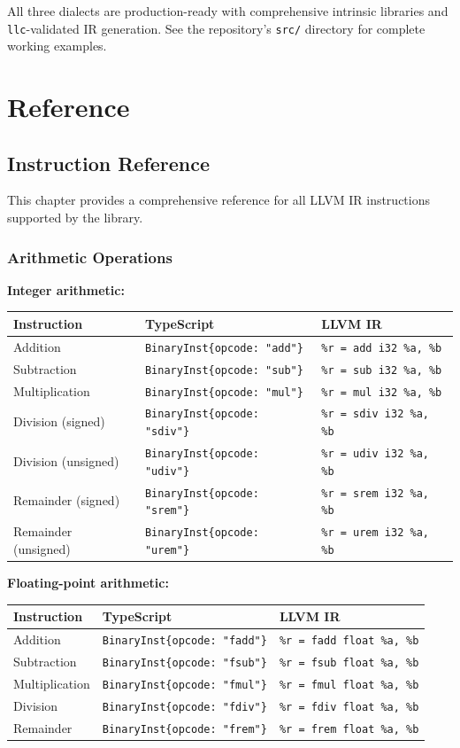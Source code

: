 \documentclass[11pt,oneside]{book}
\begin{document}
All three dialects are production-ready with comprehensive intrinsic libraries and \texttt{llc}-validated IR generation. See the repository's \texttt{src/} directory for complete working examples.

\part{Reference}

\chapter{Instruction Reference}

This chapter provides a comprehensive reference for all LLVM IR instructions supported by the library.

\section{Arithmetic Operations}

\textbf{Integer arithmetic:}
\begin{longtable}{|p{3cm}|p{5cm}|p{5cm}|}
\hline
\textbf{Instruction} & \textbf{TypeScript} & \textbf{LLVM IR} \\
\hline
Addition & \texttt{BinaryInst\{opcode: "add"\}} & \texttt{\%r = add i32 \%a, \%b} \\
\hline
Subtraction & \texttt{BinaryInst\{opcode: "sub"\}} & \texttt{\%r = sub i32 \%a, \%b} \\
\hline
Multiplication & \texttt{BinaryInst\{opcode: "mul"\}} & \texttt{\%r = mul i32 \%a, \%b} \\
\hline
Division (signed) & \texttt{BinaryInst\{opcode: "sdiv"\}} & \texttt{\%r = sdiv i32 \%a, \%b} \\
\hline
Division (unsigned) & \texttt{BinaryInst\{opcode: "udiv"\}} & \texttt{\%r = udiv i32 \%a, \%b} \\
\hline
Remainder (signed) & \texttt{BinaryInst\{opcode: "srem"\}} & \texttt{\%r = srem i32 \%a, \%b} \\
\hline
Remainder (unsigned) & \texttt{BinaryInst\{opcode: "urem"\}} & \texttt{\%r = urem i32 \%a, \%b} \\
\hline
\end{longtable}

\textbf{Floating-point arithmetic:}
\begin{longtable}{|p{3cm}|p{5cm}|p{5cm}|}
\hline
\textbf{Instruction} & \textbf{TypeScript} & \textbf{LLVM IR} \\
\hline
Addition & \texttt{BinaryInst\{opcode: "fadd"\}} & \texttt{\%r = fadd float \%a, \%b} \\
\hline
Subtraction & \texttt{BinaryInst\{opcode: "fsub"\}} & \texttt{\%r = fsub float \%a, \%b} \\
\hline
Multiplication & \texttt{BinaryInst\{opcode: "fmul"\}} & \texttt{\%r = fmul float \%a, \%b} \\
\hline
Division & \texttt{BinaryInst\{opcode: "fdiv"\}} & \texttt{\%r = fdiv float \%a, \%b} \\
\hline
Remainder & \texttt{BinaryInst\{opcode: "frem"\}} & \texttt{\%r = frem float \%a, \%b} \\
\hline
\end{longtable}
\end{document}
